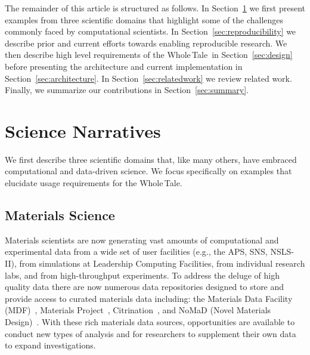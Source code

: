 \documentclass[review]{elsarticle}
\newcommand{\wt}{Whole\,Tale}
\begin{document}
The remainder of this article is structured as follows. In Section~\ref{sec:science} we first
present examples from three scientific domains that highlight some of the challenges commonly faced by computational scientists. In Section~\ref{sec:reproducibility} we describe prior and current efforts towards enabling reproducible research. We then describe high level requirements of the \wt\ in Section~\ref{sec:design} before presenting
the architecture and current implementation in Section~\ref{sec:architecture}.
In Section~\ref{sec:relatedwork} we review related work. Finally, we summarize our contributions
in Section~\ref{sec:summary}.


\section{Science Narratives}\label{sec:science}


We first describe three scientific domains that, like many others, have
embraced computational and data-driven science. We 
focus specifically on examples that elucidate usage requirements for the \wt. 

\subsection{Materials Science}
Materials scientists are now generating vast amounts of computational and 
experimental data from a wide set of user facilities (e.g., the APS, SNS, NSLS-II), 
from simulations at Leadership Computing Facilities, from individual 
research labs, and from high-throughput experiments. To address the deluge
of high quality data there are now numerous data repositories designed to 
store and provide access to curated materials data including: the Materials Data Facility (MDF)~\cite{blaiszik16mdf}, 
Materials Project~\cite{jain13materialsproject}, Citrination~\cite{omara16citrination}, and NoMaD (Novel Materials Design)~\cite{thygesen16nomad}. With these rich materials 
data sources, opportunities are available to
conduct new types of analysis and for researchers to supplement their own data to expand investigations.
 
\end{document}

